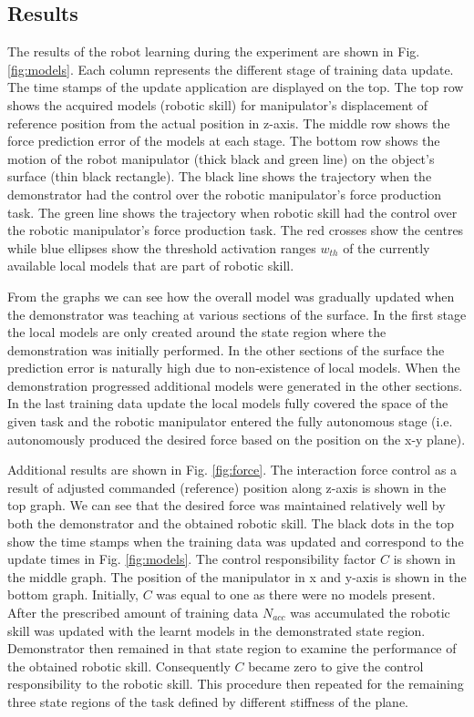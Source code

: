 \subsection{Results}
The results of the robot learning during the experiment are shown in Fig. \ref{fig:models}. Each column represents the different stage of training data update. The time stamps of the update application are displayed on the top. The top row shows the acquired models (robotic skill) for manipulator's displacement of reference position from the actual position in z-axis. The middle row shows the force prediction error of the models at each stage. The bottom row shows the motion of the robot manipulator (thick black and green line) on the object's surface (thin black rectangle). The black line shows the trajectory when the demonstrator had the control over the robotic manipulator's force production task. The green line shows the trajectory when robotic skill had the control over the robotic manipulator's force production task. The red crosses show the centres while blue ellipses show the threshold activation ranges $w_{th}$ of the currently available local models that are part of robotic skill.

From the graphs we can see how the overall model was gradually updated when the demonstrator was teaching at various sections of the surface. In the first stage the local models are only created around the state region where the demonstration was initially performed. In the other sections of the surface the prediction error is naturally high due to non-existence of local models. When the demonstration progressed additional models were generated in the other sections. In the last training data update the local models fully covered the space of the given task and the robotic manipulator entered the fully autonomous stage (i.e. autonomously produced the desired force based on the position on the x-y plane).

Additional results are shown in Fig. \ref{fig:force}. The interaction force control as a result of adjusted commanded (reference) position along z-axis is shown in the top graph. We can see that the desired force was maintained relatively well by both the demonstrator and the obtained robotic skill. The black dots in the top show the time stamps when the training data was updated and correspond to the update times in Fig. \ref{fig:models}. The control responsibility factor $C$ is shown in the middle graph. The position of the manipulator in x and y-axis is shown in the bottom graph. Initially, $C$ was equal to one as there were no models present. After the prescribed amount of training data $N_{acc}$ was accumulated the robotic skill was updated with the learnt models in the demonstrated state region. Demonstrator then remained in that state region to examine the performance of the obtained robotic skill. Consequently $C$ became zero to give the control responsibility to the robotic skill. This procedure then repeated for the remaining three state regions of the task defined by different stiffness of the plane.

